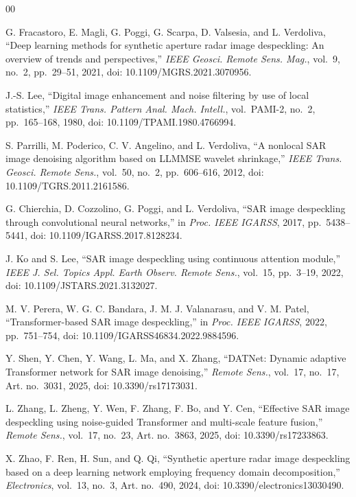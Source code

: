 \documentclass[journal]{IEEEtran}
\begin{document}
\begin{thebibliography}{00}

G. Fracastoro, E. Magli, G. Poggi, G. Scarpa, D. Valsesia, and L. Verdoliva, ``Deep learning methods for synthetic aperture radar image despeckling: An overview of trends and perspectives,'' \emph{IEEE Geosci. Remote Sens. Mag.}, vol.~9, no.~2, pp.~29--51, 2021, doi: 10.1109/MGRS.2021.3070956.

J.-S. Lee, ``Digital image enhancement and noise filtering by use of local statistics,'' \emph{IEEE Trans. Pattern Anal. Mach. Intell.}, vol.~PAMI-2, no.~2, pp.~165--168, 1980, doi: 10.1109/TPAMI.1980.4766994.

S. Parrilli, M. Poderico, C. V. Angelino, and L. Verdoliva, ``A nonlocal SAR image denoising algorithm based on LLMMSE wavelet shrinkage,'' \emph{IEEE Trans. Geosci. Remote Sens.}, vol.~50, no.~2, pp.~606--616, 2012, doi: 10.1109/TGRS.2011.2161586.

G. Chierchia, D. Cozzolino, G. Poggi, and L. Verdoliva, ``SAR image despeckling through convolutional neural networks,'' in \emph{Proc. IEEE IGARSS}, 2017, pp.~5438--5441, doi: 10.1109/IGARSS.2017.8128234.

J. Ko and S. Lee, ``SAR image despeckling using continuous attention module,'' \emph{IEEE J. Sel. Topics Appl. Earth Observ. Remote Sens.}, vol.~15, pp.~3--19, 2022, doi: 10.1109/JSTARS.2021.3132027.

M. V. Perera, W. G. C. Bandara, J. M. J. Valanarasu, and V. M. Patel, ``Transformer-based SAR image despeckling,'' in \emph{Proc. IEEE IGARSS}, 2022, pp.~751--754, doi: 10.1109/IGARSS46834.2022.9884596.

Y. Shen, Y. Chen, Y. Wang, L. Ma, and X. Zhang, ``DATNet: Dynamic adaptive Transformer network for SAR image denoising,'' \emph{Remote Sens.}, vol.~17, no.~17, Art. no.~3031, 2025, doi: 10.3390/rs17173031.

L. Zhang, L. Zheng, Y. Wen, F. Zhang, F. Bo, and Y. Cen, ``Effective SAR image despeckling using noise-guided Transformer and multi-scale feature fusion,'' \emph{Remote Sens.}, vol.~17, no.~23, Art. no.~3863, 2025, doi: 10.3390/rs17233863.

X. Zhao, F. Ren, H. Sun, and Q. Qi, ``Synthetic aperture radar image despeckling based on a deep learning network employing frequency domain decomposition,'' \emph{Electronics}, vol.~13, no.~3, Art. no.~490, 2024, doi: 10.3390/electronics13030490.


\end{thebibliography}
\end{document}
